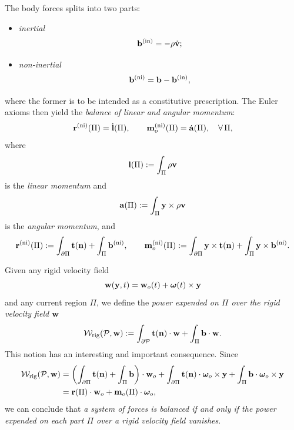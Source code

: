 The body forces splits into two parts:
\begin{itemize}
	\item \textit{inertial}
	\begin{equation}
		\mathbf{b}^{\rm (in)}=-\rho\dot{\mathbf{v}};
	\end{equation}
	\item \textit{non-inertial}
	\begin{equation}
		\mathbf{b}^{\rm (ni)}=\mathbf{b}-\mathbf{b}^{\rm (in)},
	\end{equation}
\end{itemize}
where the former is to be intended as a constitutive prescription. The Euler axioms then yield the \textit{balance of linear and angular momentum}:
\begin{equation}
	\mathbf{r}^{\rm (ni)}(\Pi)=\dot{\mathbf{l}}(\Pi), \qquad \mathbf{m}_o^{\rm (ni)}(\Pi)=\dot{\mathbf{a}}(\Pi), \quad \forall\,\Pi,
\end{equation}
where 
\begin{equation}
	\mathbf{l}(\Pi):=\int_{\Pi}\rho\mathbf{v}
\end{equation}
is the \textit{linear momentum} and 
\begin{equation}
	\mathbf{a}(\Pi):=\int_{\Pi}\mathbf{y}\times\rho\mathbf{v}
\end{equation}
is the \textit{angular momentum}, and
\begin{equation}
	\mathbf{r}^{\rm (ni)}(\Pi):=\int_{\partial\Pi}\mathbf{t}(\mathbf{n})+\int_{\Pi}\mathbf{b}^{\rm (ni)}, \qquad \mathbf{m}_o^{\rm (ni)}(\Pi):=\int_{\partial\Pi}\mathbf{y}\times\mathbf{t}(\mathbf{n})+\int_{\Pi}\mathbf{y}\times\mathbf{b}^{\rm (ni)}.
\end{equation}

\begin{remark}
Given any rigid velocity field 
\begin{equation}
	\mathbf{w}(\mathbf{y},t)=\mathbf{w}_o(t)+\bm{\omega}(t)\times\mathbf{y}
\end{equation}
and any current region $\Pi$, we define the \textit{power expended on $\Pi$ over the rigid velocity field} $\mathbf{w}$
\begin{equation}
	\mathcal{W}_{\rm rig}(\mathcal{P},\mathbf{w}):=\int_{\partial\mathcal{P}}\mathbf{t}(\mathbf{n})\cdot\mathbf{w}+\int_{\Pi}\mathbf{b}\cdot\mathbf{w}.
\end{equation}
This notion has an interesting and important consequence. Since
\begin{equation}
	\begin{aligned}
		\mathcal{W}_{\rm rig}(\mathcal{P},\mathbf{w})&=\left(\int_{\partial\Pi}\mathbf{t}(\mathbf{n}) + \int_{\Pi}\mathbf{b} \right)\cdot \mathbf{w}_o+\int_{\partial\Pi}\mathbf{t}(\mathbf{n})\cdot\bm{\omega}_o\times\mathbf{y}+\int_{\Pi}\mathbf{b}\cdot \bm{\omega}_o\times\mathbf{y}\\
		&=\mathbf{r}(\Pi)\cdot\mathbf{w}_o+\mathbf{m}_o(\Pi)\cdot\bm{\omega}_o,
	\end{aligned}
\end{equation}
we can conclude that \textit{a system of forces is balanced if and only if the power  expended on each part $\Pi$ over a rigid velocity field vanishes}.
\end{remark}

